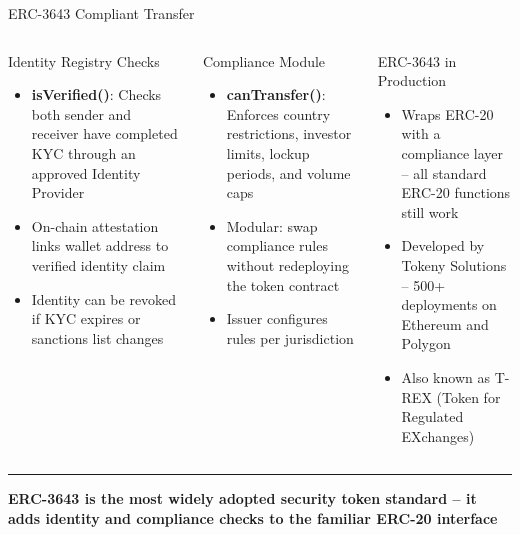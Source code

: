 \documentclass[8pt,aspectratio=169]{beamer}
\newcommand{\bottomnote}[1]{\vfill\vspace{-2mm}\textcolor{mllavender2}{\rule{\textwidth}{0.4pt}}\vspace{1mm}\footnotesize\textbf{#1}}
\begin{document}
\begin{frame}[fragile]{ERC-3643 Compliant Transfer}
\begin{columns}[T]
\vspace{2mm}
\begin{block}{Identity Registry Checks}
\footnotesize
\begin{itemize}
  \item \textbf{isVerified()}: Checks both sender and receiver have completed KYC through an approved Identity Provider
  \item On-chain attestation links wallet address to verified identity claim
  \item Identity can be revoked if KYC expires or sanctions list changes
\end{itemize}
\end{block}
\vspace{2mm}
\begin{block}{Compliance Module}
\footnotesize
\begin{itemize}
  \item \textbf{canTransfer()}: Enforces country restrictions, investor limits, lockup periods, and volume caps
  \item Modular: swap compliance rules without redeploying the token contract
  \item Issuer configures rules per jurisdiction
\end{itemize}
\end{block}
\vspace{2mm}
\begin{block}{ERC-3643 in Production}
\footnotesize
\begin{itemize}
  \item Wraps ERC-20 with a compliance layer -- all standard ERC-20 functions still work
  \item Developed by Tokeny Solutions -- 500+ deployments on Ethereum and Polygon
  \item Also known as T-REX (Token for Regulated EXchanges)
\end{itemize}
\end{block}
\end{columns}
\bottomnote{ERC-3643 is the most widely adopted security token standard -- it adds identity and compliance checks to the familiar ERC-20 interface}
\end{frame}
\end{document}
